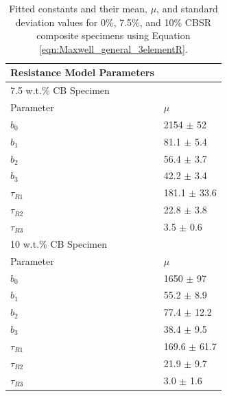 \begin{table}[H]
	\caption{Fitted constants and their mean, $\mu$, and standard deviation values for 0\%, 7.5\%, and 10\% CBSR composite specimens using Equation \ref{eqn:Maxwell_general_3elementR}.}
	\begin{center}
		\label{tab:generalised_model_constants}
		\begin{tabular}{l l}
			\textbf{Resistance Model Parameters} & \\
			\hline
			7.5 w.t.\% CB Specimen & \\
			\hline
			Parameter & $\mu$\\
			\hline
			$b_0$ & 2154 $\pm$ 52\\
			$b_1$ & 81.1 $\pm$ 5.4\\
			$b_2$ & 56.4 $\pm$ 3.7\\
			$b_3$ & 42.2 $\pm$ 3.4\\
			$\tau_{R1}$ & 181.1 $\pm$ 33.6 \\
			$\tau_{R2}$ & 22.8 $\pm$ 3.8 \\
			$\tau_{R3}$ & 3.5 $\pm$ 0.6 \\
			\hline
			10 w.t.\% CB Specimen & \\
			\hline
			Parameter & $\mu$ \\
			\hline
			$b_0$ & 1650 $\pm$ 97\\
			$b_1$ & 55.2 $\pm$ 8.9 \\
			$b_2$ & 77.4 $\pm$ 12.2 \\
			$b_3$ & 38.4 $\pm$ 9.5 \\
			$\tau_{R1}$ & 169.6 $\pm$ 61.7 \\
			$\tau_{R2}$ & 21.9 $\pm$ 9.7 \\
			$\tau_{R3}$ & 3.0 $\pm$ 1.6 \\
			\hline
		\end{tabular}
	\end{center}
\end{table}


